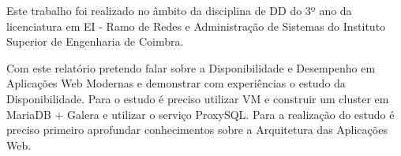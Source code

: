 
Este trabalho foi realizado no âmbito da disciplina de \ac{DD} do 3º ano da licenciatura em \ac{EI} - Ramo de Redes e Administração de Sistemas do Instituto Superior de Engenharia de Coimbra.

Com este relatório pretendo falar sobre a Disponibilidade e Desempenho em Aplicações Web Modernas e demonstrar com experiências o estudo da Disponibilidade. Para o estudo é preciso utilizar \ac{VM} e construir um cluster em MariaDB + Galera e utilizar o serviço ProxySQL. Para a realização do estudo é preciso primeiro aprofundar conhecimentos sobre a Arquitetura das Aplicações Web. 